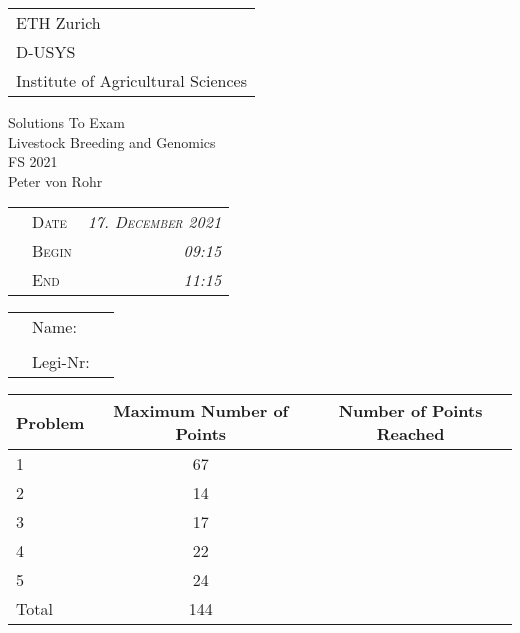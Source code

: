 \documentclass[
]{article}
\author{}
\date{\vspace{-2.5em}}
\begin{document}
\thispagestyle{empty}

\begin{tabular}{l}
ETH Zurich \\
D-USYS\\
Institute of Agricultural Sciences\\
\end{tabular}

\vspace{15ex}
\begin{center}
\huge
Solutions To Exam\\ \vspace{1ex}
Livestock Breeding and Genomics \\  \vspace{1ex}
FS 2021 \\

\normalsize
\vspace{7ex}
Peter von Rohr 
\end{center}

\vspace{7ex}
\begin{tabular}{p{5cm}lr}
  & \textsc{Date}  & \textsc{\emph{17. December 2021}} \\
  & \textsc{Begin} & \textsc{\emph{09:15 }}\\
  & \textsc{End}   & \textsc{\emph{11:15 }}\\ 
\end{tabular}

\vspace{5ex}

\large
\begin{tabular}{p{2.5cm}p{3cm}p{6cm}}
  &  Name:     &  \\
  &            &  \\
  &  Legi-Nr:  & \\
\end{tabular}
\normalsize

\vspace{9ex}
\begin{center}
\begin{tabular}{|p{3cm}|c|c|}
\hline
Problem  &  Maximum Number of Points  &  Number of Points Reached \\
\hline
1        &  67         & \\
\hline
2        &  14         & \\
\hline
3        &  17         & \\
\hline
4        &  22          & \\
\hline
5        &  24          & \\
\hline
Total    &  144    & \\
\hline
\end{tabular}
\end{center}
\end{document}

